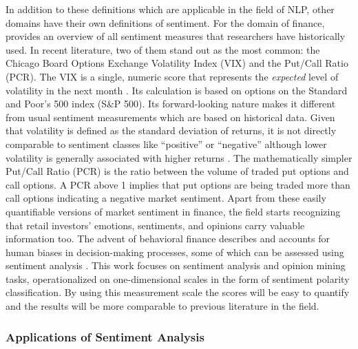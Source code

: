 In addition to these definitions which are applicable in the field of NLP, other domains have their own definitions of sentiment. For the domain of finance,  provides an overview of all sentiment measures that researchers have historically used. In recent literature, two of them stand out as the most common: the Chicago Board Options Exchange Volatility Index (VIX) and the Put/Call Ratio (PCR). The VIX is a single, numeric score that represents the \emph{expected} level of volatility in the next month . Its calculation is based on options on the Standard and Poor's 500 index (S\&P 500). Its forward-looking nature makes it different from usual sentiment measurements which are based on historical data. Given that volatility is defined as the standard deviation of returns, it is not directly comparable to sentiment classes like ``positive'' or ``negative'' although lower volatility is generally associated with higher returns . The mathematically simpler Put/Call Ratio (PCR) is the ratio between the volume of traded put options and call options. A PCR above 1 implies that put options are being traded more than call options indicating a negative market sentiment. Apart from these easily quantifiable versions of market sentiment in finance, the field starts recognizing that retail investors' emotions, sentiments, and opinions carry valuable information too. The advent of behavioral finance describes and accounts for human biases in decision-making processes, some of which can be assessed using sentiment analysis .\newline 
This work focuses on sentiment analysis and opinion mining tasks, operationalized on one-dimensional scales in the form of sentiment polarity classification. By using this measurement scale the scores will be easy to quantify and the results will be more comparable to previous literature in the field.


\subsubsection{Applications of Sentiment Analysis}

